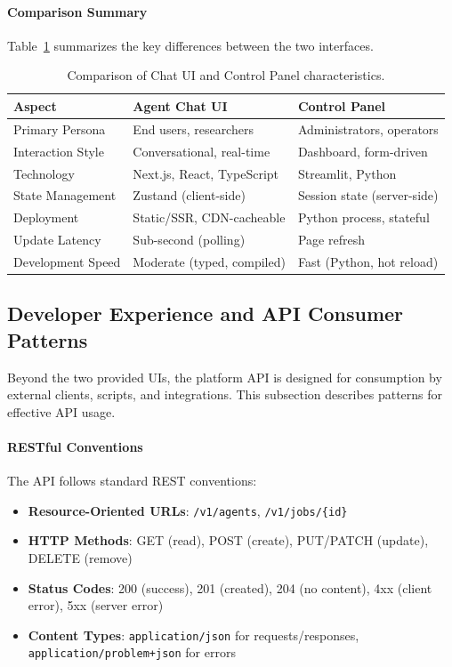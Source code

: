 \paragraph{Comparison Summary}
Table~\ref{tab:ui-comparison} summarizes the key differences between the two interfaces.

\begin{table}[htbp]
    \centering
    \caption{Comparison of Chat UI and Control Panel characteristics.}
    \label{tab:ui-comparison}
    \small
    \begin{tabularx}{\textwidth}{lXX}
        \toprule
        \textbf{Aspect} & \textbf{Agent Chat UI} & \textbf{Control Panel} \\
        \midrule
        Primary Persona & End users, researchers & Administrators, operators \\
        Interaction Style & Conversational, real-time & Dashboard, form-driven \\
        Technology & Next.js, React, TypeScript & Streamlit, Python \\
        State Management & Zustand (client-side) & Session state (server-side) \\
        Deployment & Static/SSR, CDN-cacheable & Python process, stateful \\
        Update Latency & Sub-second (polling) & Page refresh \\
        Development Speed & Moderate (typed, compiled) & Fast (Python, hot reload) \\
        \bottomrule
    \end{tabularx}
\end{table}

\subsection{Developer Experience and API Consumer Patterns}
\label{subsec:developer-experience}

Beyond the two provided UIs, the platform API is designed for consumption by external clients, scripts, and integrations. This subsection describes patterns for effective API usage.

\paragraph{RESTful Conventions}
The API follows standard REST conventions:
\begin{itemize}
    \item \textbf{Resource-Oriented URLs}: \texttt{/v1/agents}, \texttt{/v1/jobs/\{id\}}
    \item \textbf{HTTP Methods}: GET (read), POST (create), PUT/PATCH (update), DELETE (remove)
    \item \textbf{Status Codes}: 200 (success), 201 (created), 204 (no content), 4xx (client error), 5xx (server error)
    \item \textbf{Content Types}: \texttt{application/json} for requests/responses, \texttt{application/problem+json} for errors
\end{itemize}

